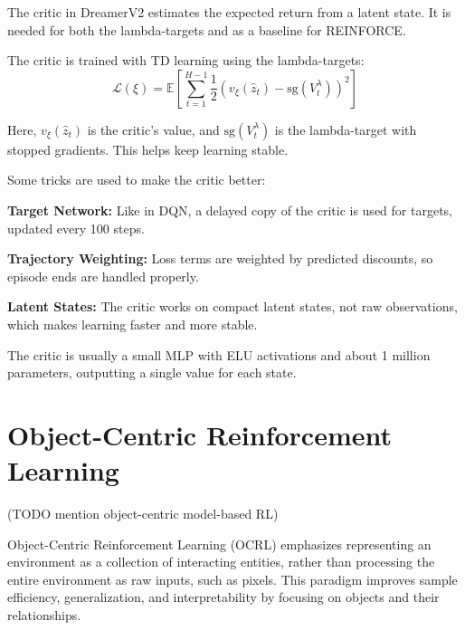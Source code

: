 \documentclass[
	english,
	ruledheaders=section,
	class=report,
	thesis={type=master},
	accentcolor=9c,
	custommargins=true,
	marginpar=false,
	parskip=half-,
	fontsize=11pt,
]{tudapub}
\begin{document}
The critic in DreamerV2 estimates the expected return from a latent state. It
is needed for both the lambda-targets and as a baseline for REINFORCE.

The critic is trained with TD learning using the lambda-targets:
\begin{equation}
	\mathcal{L}(\xi) = \mathbb{E}\left[\sum_{t=1}^{H-1} \frac{1}{2} \left(v_\xi(\hat{z}_t) - \text{sg}(V^{\lambda}_t)\right)^2\right]
\end{equation}

Here, $v_\xi(\hat{z}_t)$ is the critic's value, and $\text{sg}(V^{\lambda}_t)$
is the lambda-target with stopped gradients. This helps keep learning stable.

Some tricks are used to make the critic better:

\textbf{Target Network:} Like in DQN, a delayed copy of the critic is used for targets, updated every 100 steps.

\textbf{Trajectory Weighting:} Loss terms are weighted by predicted discounts, so episode ends are handled properly.

\textbf{Latent States:} The critic works on compact latent states, not raw observations, which makes learning faster and more stable.

The critic is usually a small MLP with ELU activations and about 1 million
parameters, outputting a single value for each state.



\section{Object-Centric Reinforcement Learning}
\label{sec:object_centric_rl}
(TODO mention object-centric model-based RL)

Object-Centric Reinforcement Learning (OCRL) emphasizes representing an
environment as a collection of interacting entities, rather than processing the
entire environment as raw inputs, such as pixels. This paradigm improves sample
efficiency, generalization, and interpretability by focusing on objects and
their relationships.
\end{document}
